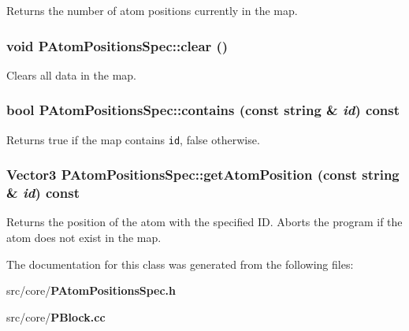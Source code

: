 Returns the number of atom positions currently in the map. 
\subsubsection{\setlength{\rightskip}{0pt plus 5cm}void PAtom\-Positions\-Spec::clear ()\hspace{0.3cm}{\tt  [inline]}}\label{classPAtomPositionsSpec_aa492684c66a526ee3654017ae7ae828}


Clears all data in the map. 
\subsubsection{\setlength{\rightskip}{0pt plus 5cm}bool PAtom\-Positions\-Spec::contains (const string \& {\em id}) const\hspace{0.3cm}{\tt  [inline]}}\label{classPAtomPositionsSpec_536a6acbb5c52d0e01bfabd8947b3693}


Returns true if the map contains {\tt id}, false otherwise. 
\subsubsection{\setlength{\rightskip}{0pt plus 5cm}Vector3 PAtom\-Positions\-Spec::get\-Atom\-Position (const string \& {\em id}) const}\label{classPAtomPositionsSpec_8299e825db261c5347bc45aaa16dc79d}


Returns the position of the atom with the specified ID. Aborts the program if the atom does not exist in the map. 

The documentation for this class was generated from the following files:\begin{CompactItemize}
\item 
src/core/{\bf PAtom\-Positions\-Spec.h}\item 
src/core/{\bf PBlock.cc}\end{CompactItemize}
